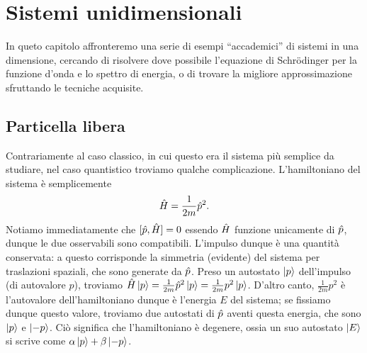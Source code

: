 \chapter{Sistemi unidimensionali}
In queto capitolo affronteremo una serie di esempi ``accademici'' di sistemi in una dimensione, cercando di risolvere dove possibile l'equazione di Schr\"odinger per la funzione d'onda e lo spettro di energia, o di trovare la migliore approssimazione sfruttando le tecniche acquisite.

\section{Particella libera}
Contrariamente al caso classico, in cui questo era il sistema più semplice da studiare, nel caso quantistico troviamo qualche complicazione.
L'hamiltoniano del sistema è semplicemente
\begin{equation}
	\hat{H}=\frac1{2m}\hat{p}^2.
	\label{eq:H-particella-libera}
\end{equation}
Notiamo immediatamente che $[\hat{p},\hat{H}]=0$ essendo $\hat{H}$ funzione unicamente di $\hat{p}$, dunque le due osservabili sono compatibili.
L'impulso dunque è una quantità conservata: a questo corrisponde la simmetria (evidente) del sistema per traslazioni spaziali, che sono generate da $\hat{p}$.
Preso un autostato $\left|{p}\right\rangle$ dell'impulso (di autovalore $p$), troviamo $\hat{H}\left|{p}\right\rangle=\frac1{2m}\hat{p}^2\left|{p}\right\rangle=\frac1{2m}p^2\left|{p}\right\rangle$.
D'altro canto, $\frac1{2m}p^2$ è l'autovalore dell'hamiltoniano dunque è l'energia $E$ del sistema; se fissiamo dunque questo valore, troviamo due autostati di $\hat{p}$ aventi questa energia, che sono $\left|{p}\right\rangle$ e $\left|{-p}\right\rangle$.
Ciò significa che l'hamiltoniano è degenere, ossia un suo autostato $\left|{E}\right\rangle$ si scrive come $\alpha\left|{p}\right\rangle+\beta\left|{-p}\right\rangle$.

